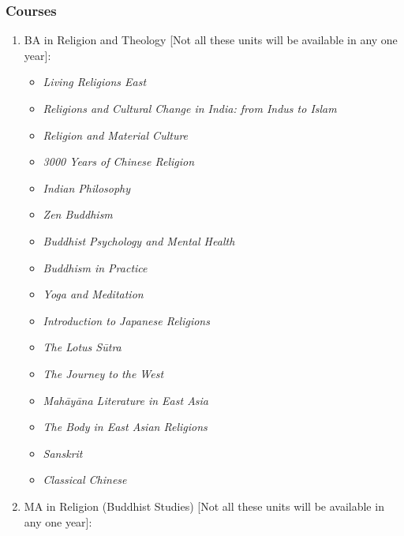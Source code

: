\documentclass[a4paper,10.5pt]{article}
\begin{document}
\subsubsection{Courses}
\label{sec:org58f5271}
\begin{enumerate}
\item BA in Religion and Theology [Not all these units will be available in any one year]:
\label{sec:org211ad09}
\begin{itemize}
\item \emph{Living Religions East}\\
\item \emph{Religions and Cultural Change in India: from Indus to Islam}\\
\item \emph{Religion and Material Culture}\\
\item \emph{3000 Years of Chinese Religion}\\
\item \emph{Indian Philosophy}\\
\item \emph{Zen Buddhism}\\
\item \emph{Buddhist Psychology and Mental Health}\\
\item \emph{Buddhism in Practice}\\
\item \emph{Yoga and Meditation}\\
\item \emph{Introduction to Japanese Religions}\\
\item \emph{The Lotus Sūtra}\\
\item \emph{The Journey to the West}\\
\item \emph{Mahāyāna Literature in East Asia}\\
\item \emph{The Body in East Asian Religions}\\
\item \emph{Sanskrit}\\
\item \emph{Classical Chinese}\\
\end{itemize}
\item MA in Religion (Buddhist Studies) [Not all these units will be available in any one year]:

\end{enumerate}
\end{document}
